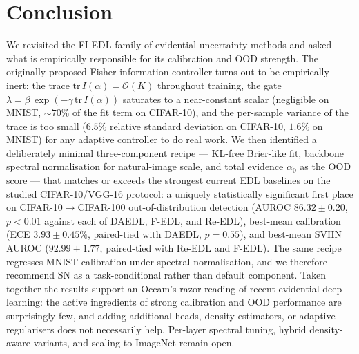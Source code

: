 \documentclass[review,5p,times]{elsarticle}
\begin{document}
\section{Conclusion}\label{sec:conclusion}

We revisited the FI-EDL family of evidential uncertainty methods and
asked what is empirically responsible for its calibration and OOD
strength. The originally proposed Fisher-information controller turns
out to be empirically inert: the trace $\mathrm{tr}\,I(\alpha)\!=\!
\mathcal{O}(K)$ throughout training, the gate
$\lambda\!=\!\beta\,\exp(-\gamma\,\mathrm{tr}\,I(\alpha))$ saturates to a
near-constant scalar (negligible on MNIST, $\sim\!70\%$ of the fit term
on CIFAR-10), and the per-sample variance of the trace is too small
($6.5\%$ relative standard deviation on CIFAR-10, $1.6\%$ on MNIST) for
any adaptive controller to do real work. We then identified a
deliberately minimal three-component recipe --- KL-free Brier-like fit,
backbone spectral normalisation for natural-image scale, and total
evidence $\alpha_0$ as the OOD score --- that matches or exceeds the
strongest current EDL baselines on the studied CIFAR-10/VGG-16 protocol:
a uniquely statistically significant first place on CIFAR-10$\to$CIFAR-100
out-of-distribution detection (AUROC $86.32\!\pm\!0.20$,
$p\!<\!0.01$ against each of DAEDL, F-EDL, and Re-EDL), best-mean
calibration (ECE $3.93\!\pm\!0.45\%$, paired-tied with DAEDL,
$p\!=\!0.55$), and best-mean SVHN AUROC ($92.99\!\pm\!1.77$, paired-tied
with Re-EDL and F-EDL). The same recipe regresses MNIST calibration
under spectral normalisation, and we therefore recommend SN as a
task-conditional rather than default component. Taken together the
results support an Occam's-razor reading of recent evidential deep
learning: the active ingredients of strong calibration and OOD
performance are surprisingly few, and adding additional heads, density
estimators, or adaptive regularisers does not necessarily help. Per-layer
spectral tuning, hybrid density-aware variants, and scaling to ImageNet
remain open.



\end{document}
